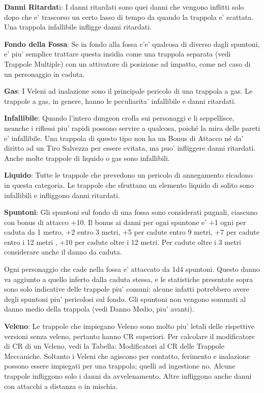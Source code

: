 \documentclass[a4paper,11pt,twoside,openany]{book}
\begin{document}
{		\textbf{Danni Ritardat}i: I danni ritardati sono quei danni che vengono inflitti solo dopo che e' trascorso un certo lasso di tempo da quando la trappola e' scattata. Una trappola infallibile infligge danni ritardati. 
		
		\textbf{Fondo della Fossa}: Se in fondo alla fossa c'e' qualcosa di diverso dagli spuntoni, e' piu' semplice trattare questa insidia come una trappola separata (vedi Trappole Multiple) con un attivatore di posizione ad impatto, come nel caso di un personaggio in caduta. 
		
		\textbf{Gas}: I Veleni ad inalazione sono il principale pericolo di una trappola a gas. Le trappole a gas, in genere, hanno le peculiarita' infallibile e danni ritardati.
		
		\textbf{Infallibile}: Quando l'intero dungeon crolla sui personaggi e li seppellisce, neanche i riflessi piu' rapidi possono servire a qualcosa, poiché la mira delle pareti e' infallibile. Una trappola di questo tipo non ha un Bonus di Attacco né da' diritto ad un Tiro Salvezza per essere evitata, ma puo' infliggere danni ritardati. Anche molte trappole di liquido o gas sono infallibili.
		
		\textbf{Liquido}: Tutte le trappole che prevedono un pericolo di annegamento ricadono in questa categoria. Le trappole che sfruttano un elemento liquido di solito sono infallibili e infliggono danni ritardati. 
		
		\textbf{Spuntoni}: Gli spuntoni sul fondo di una fossa sono considerati pugnali, ciascuno con bonus di attacco +10. Il bonus ai danni per ogni spuntone e' +1 ogni per caduta da 1 metro, +2 entro 3 metri, +5 per cadute entro 9 metri, +7 per cadute entro i 12 metri , +10 per cadute oltre i 12 metri. Per cadute oltre i 3 metri considerare anche il danno da caduta.
		
		Ogni personaggio che cade nella fossa e' attaccato da 1d4 spuntoni. Questo danno va aggiunto a quello inferto dalla caduta stessa, e le statistiche presentate sopra sono solo indicative delle trappole piu' comuni: alcune infatti potrebbero avere degli spuntoni piu' pericolosi sul fondo. Gli spuntoni non vengono sommati al danno medio della trappola (vedi Danno Medio, piu' avanti).
		
		\textbf{Veleno}: Le trappole che impiegano Veleno sono molto piu' letali delle rispettive versioni senza veleno, pertanto hanno CR superiori. Per calcolare il modificatore di CR di un Veleno, vedi la Tabella: Modificatori al CR delle Trappole Meccaniche. Soltanto i Veleni che agiscono per contatto, ferimento e inalazione possono essere impiegati per una trappola; quelli ad ingestione no. Alcune trappole infliggono solo i danni da avvelenamento. Altre infliggono anche danni con attacchi a distanza o in mischia.
		
}
\end{document}
